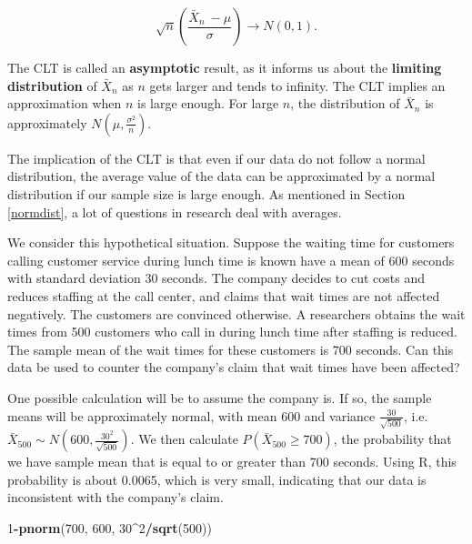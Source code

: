 \documentclass[
]{book}
\newenvironment{Shaded}{\begin{snugshade}}{\end{snugshade}}
\newcommand{\DecValTok}[1]{\textcolor[rgb]{0.00,0.00,0.81}{#1}}
\newcommand{\FunctionTok}[1]{\textcolor[rgb]{0.13,0.29,0.53}{\textbf{#1}}}
\newcommand{\NormalTok}[1]{#1}
\newcommand{\SpecialCharTok}[1]{\textcolor[rgb]{0.81,0.36,0.00}{\textbf{#1}}}
\begin{document}
\begin{equation} 
\sqrt{n} \left(\frac{\bar{X}_n \ - \mu}{\sigma} \right) \to N(0,1).
\label{eq:6-CLT}
\end{equation}

The CLT is called an \textbf{asymptotic} result, as it informs us about the \textbf{limiting distribution} of \(\bar{X}_n\) as \(n\) gets larger and tends to infinity. The CLT implies an approximation when \(n\) is large enough. For large \(n\), the distribution of \(\bar{X}_n\) is approximately \(N(\mu, \frac{\sigma^2}{n})\).

The implication of the CLT is that even if our data do not follow a normal distribution, the average value of the data can be approximated by a normal distribution if our sample size is large enough. As mentioned in Section \ref{normdist}, a lot of questions in research deal with averages.

We consider this hypothetical situation. Suppose the waiting time for customers calling customer service during lunch time is known have a mean of 600 seconds with standard deviation 30 seconds. The company decides to cut costs and reduces staffing at the call center, and claims that wait times are not affected negatively. The customers are convinced otherwise. A researchers obtains the wait times from 500 customers who call in during lunch time after staffing is reduced. The sample mean of the wait times for these customers is 700 seconds. Can this data be used to counter the company's claim that wait times have been affected?

One possible calculation will be to assume the company is. If so, the sample means will be approximately normal, with mean 600 and variance \(\frac{30}{\sqrt{500}}\), i.e.~\(\bar{X}_{500} \sim N(600, \frac{30^2}{\sqrt{500}})\). We then calculate \(P(\bar{X}_{500} \geq 700)\), the probability that we have sample mean that is equal to or greater than 700 seconds. Using R, this probability is about 0.0065, which is very small, indicating that our data is inconsistent with the company's claim.

\begin{Shaded}
\begin{Highlighting}[]
\DecValTok{1}\SpecialCharTok{{-}}\FunctionTok{pnorm}\NormalTok{(}\DecValTok{700}\NormalTok{, }\DecValTok{600}\NormalTok{, }\DecValTok{30}\SpecialCharTok{\^{}}\DecValTok{2}\SpecialCharTok{/}\FunctionTok{sqrt}\NormalTok{(}\DecValTok{500}\NormalTok{))}
\end{Highlighting}
\end{Shaded}
\end{document}
